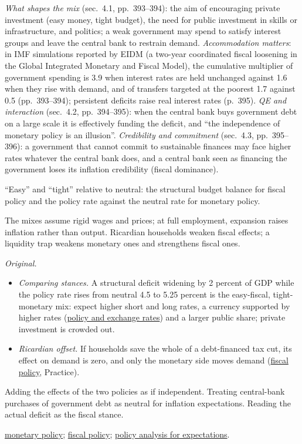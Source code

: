 \begin{qfmethod}
\emph{What shapes the mix} (sec.~4.1, pp.~393--394): the aim of encouraging private investment (easy money, tight budget), the need for public investment in skills or infrastructure, and politics; a weak government may spend to satisfy interest groups and leave the central bank to restrain demand. \emph{Accommodation matters}: in IMF simulations reported by EIDM (a two-year coordinated fiscal loosening in the Global Integrated Monetary and Fiscal Model), the cumulative multiplier of government spending is 3.9 when interest rates are held unchanged against 1.6 when they rise with demand, and of transfers targeted at the poorest 1.7 against 0.5 (pp.~393--394); persistent deficits raise real interest rates (p.~395). \emph{QE and interaction} (sec.~4.2, pp.~394--395): when the central bank buys government debt on a large scale it is effectively funding the deficit, and ``the independence of monetary policy is an illusion''. \emph{Credibility and commitment} (sec.~4.3, pp.~395--396): a government that cannot commit to sustainable finances may face higher rates whatever the central bank does, and a central bank seen as financing the government loses its inflation credibility (fiscal dominance).

 ``Easy'' and ``tight'' relative to neutral: the structural budget balance for fiscal policy and the policy rate against the neutral rate for monetary policy.

 The mixes assume rigid wages and prices; at full employment, expansion raises inflation rather than output. Ricardian households weaken fiscal effects; a liquidity trap weakens monetary ones and strengthens fiscal ones.

 \emph{Original.}
\begin{itemize}
\item \emph{Comparing stances.} A structural deficit widening by 2 percent of GDP while the policy rate rises from neutral 4.5 to 5.25 percent is the easy-fiscal, tight-monetary mix: expect higher short and long rates, a currency supported by higher rates (\hyperref[def:flows-policy-exchange-rates]{policy and exchange rates}) and a larger public share; private investment is crowded out.
\item \emph{Ricardian offset.} If households save the whole of a debt-financed tax cut, its effect on demand is zero, and only the monetary side moves demand (\hyperref[def:fiscal-policy-tools-stance]{fiscal policy}, Practice).
\end{itemize}

 Adding the effects of the two policies as if independent. Treating central-bank purchases of government debt as neutral for inflation expectations. Reading the actual deficit as the fiscal stance.

 \hyperref[def:monetary-policy-transmission-regimes]{monetary policy}; \hyperref[def:fiscal-policy-tools-stance]{fiscal policy}; \hyperref[meth:cycle-policy-curve-expectations]{policy analysis for expectations}.

\end{qfmethod}
